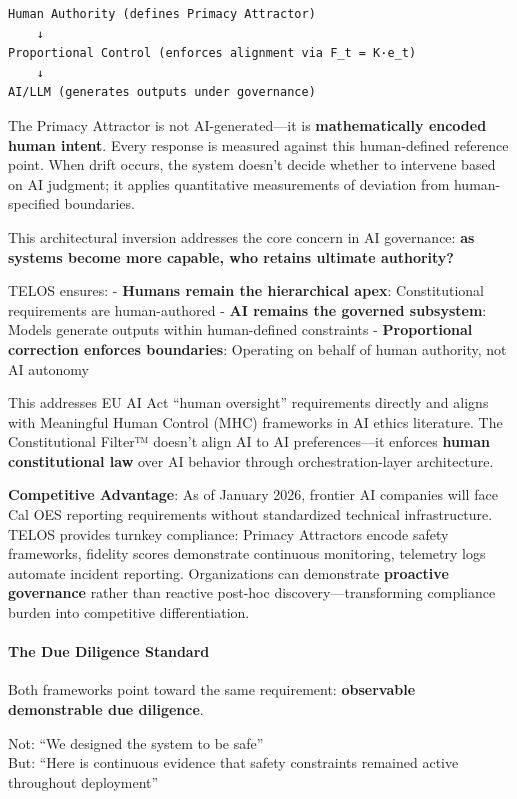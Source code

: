 \begin{verbatim}
Human Authority (defines Primacy Attractor)
    ↓
Proportional Control (enforces alignment via F_t = K·e_t)
    ↓
AI/LLM (generates outputs under governance)
\end{verbatim}

The Primacy Attractor is not AI-generated---it is \textbf{mathematically
encoded human intent}. Every response is measured against this
human-defined reference point. When drift occurs, the system doesn't
decide whether to intervene based on AI judgment; it applies
quantitative measurements of deviation from human-specified boundaries.

This architectural inversion addresses the core concern in AI
governance: \textbf{as systems become more capable, who retains ultimate
authority?}

TELOS ensures: - \textbf{Humans remain the hierarchical apex}:
Constitutional requirements are human-authored - \textbf{AI remains the
governed subsystem}: Models generate outputs within human-defined
constraints - \textbf{Proportional correction enforces boundaries}:
Operating on behalf of human authority, not AI autonomy

This addresses EU AI Act ``human oversight'' requirements directly and
aligns with Meaningful Human Control (MHC) frameworks in AI ethics
literature. The Constitutional Filter™ doesn't align AI to AI
preferences---it enforces \textbf{human constitutional law} over AI
behavior through orchestration-layer architecture.

\textbf{Competitive Advantage}: As of January 2026, frontier AI
companies will face Cal OES reporting requirements without standardized
technical infrastructure. TELOS provides turnkey compliance: Primacy
Attractors encode safety frameworks, fidelity scores demonstrate
continuous monitoring, telemetry logs automate incident reporting.
Organizations can demonstrate \textbf{proactive governance} rather than
reactive post-hoc discovery---transforming compliance burden into
competitive differentiation.

\paragraph{The Due Diligence Standard}\label{the-due-diligence-standard}

Both frameworks point toward the same requirement: \textbf{observable
demonstrable due diligence}.

Not: ``We designed the system to be safe''\\
But: ``Here is continuous evidence that safety constraints remained
active throughout deployment''

